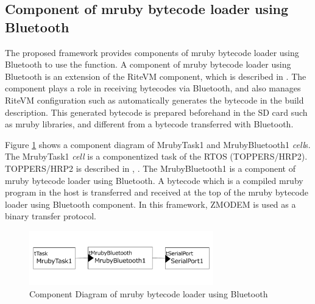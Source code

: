\documentclass[conference,compsoc]{IEEEtran}
\begin{document}
\subsection{Component of mruby bytecode loader using Bluetooth}
The proposed framework provides components of mruby bytecode loader using Bluetooth to use the function.
A component of mruby bytecode loader using Bluetooth is an extension of the RiteVM component, which is described in \cite{par:mrubyonTECS}.
The component plays a role in receiving bytecodes via Bluetooth, and also manages RiteVM configuration such as automatically generates the bytecode in the build description.
This generated bytecode is prepared beforehand in the SD card such as mruby libraries, and different from a bytecode transferred with Bluetooth.

Figure \ref{fig:component_bluetooth} shows a component diagram of MrubyTask1 and MrubyBluetooth1 {\it cell}s.
The MrubyTask1 {\it cell} is a componentized task of the RTOS (TOPPERS/HRP2).
TOPPERS/HRP2 is described in \cite{url:HRP2}, \cite{par:ht-tecs}.
The MrubyBluetooth1 is a component of mruby bytecode loader using Bluetooth.
A bytecode which is a compiled mruby program in the host is transferred and received at the top of the mruby bytecode loader using Bluetooth component.
In this framework, ZMODEM \cite{par:zmodem} is used as a binary transfer protocol.

\begin{figure}[t]
    \centering
    \includegraphics[width=8cm,clip]{figure/component_bluetooth.pdf}
    \caption{Component Diagram of mruby bytecode loader using Bluetooth}
    \label{fig:component_bluetooth}
\end{figure}
\end{document}
